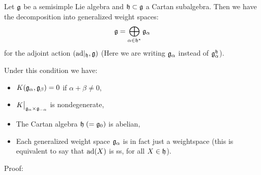 \begin{dang}
    \begin{lemma}
        Let $\mathfrak{g}$ be a semisimple Lie algebra and $\mathfrak{h}\subset \mathfrak{g}$ a Cartan subalgebra. Then we have the decomposition 
        into generalized weight spaces:
        \begin{equation}
            \mathfrak{g}=\bigoplus_{\alpha\in\mathfrak{h}^*}\mathfrak{g}_\alpha
        \end{equation}
        for the adjoint action $(\text{ad}|_{\mathfrak{h}},\mathfrak{g})$
        (Here we are writing $\mathfrak{g}_\alpha$ instead of $\mathfrak{g}_\alpha^{\mathfrak{h}}$).
        \par

        Under this condition we have:
        \begin{itemize}
            \item[1.] $K(\mathfrak{g}_\alpha,\mathfrak{g}_\beta)=0$ if $\alpha+\beta\neq0$,
            \item[2.] $K\big|_{\mathfrak{g}_\alpha\times\mathfrak{g}_{-\alpha}}$ is nondegenerate,
            \item[3.] The Cartan algebra $\mathfrak{h}\;(=\mathfrak{g}_0)$ is abelian, 
            \item[4.] Each generalized weight space $\mathfrak{g}_\alpha$ is in fact just a weightspace 
            (this is equivalent to say that $\text{ad}(X)$ is ss, for all $X\in\mathfrak{h}$).
        \end{itemize}
    \end{lemma}
\end{dang}
Proof: 
